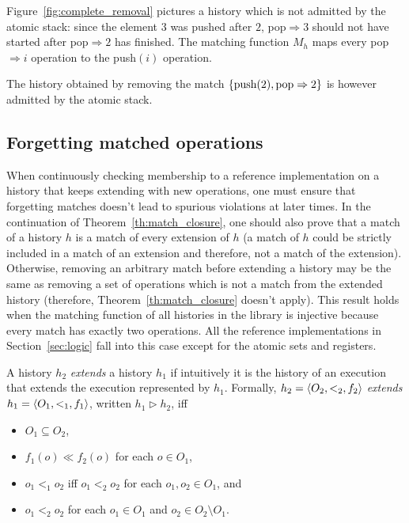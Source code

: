 \begin{example}
  \label{ex:complete_removal}

  Figure~\ref{fig:complete_removal} pictures a history which is not admitted by
  the atomic stack: since the element $3$ was pushed after $2$, pop$\Rightarrow
  3$ should not have started after pop$\Rightarrow 2$ has finished. The
  matching function $M_h$ maps every pop$\Rightarrow i$ operation to the
  push$(i)$ operation.

  The history obtained by removing the match ${\{  \text{push}(2),
  \text{pop}\Rightarrow 2  \}}$ is however admitted by the atomic stack.

\end{example}

\subsection{Forgetting matched operations}

When continuously checking membership to a reference implementation on a
history that keeps extending with new operations, one must ensure that
forgetting matches doesn't lead to spurious violations at later times. In the
continuation of Theorem~\ref{th:match_closure}, one should also prove that a
match of a history $h$ is a match of every extension of $h$ (a match of $h$
could be strictly included in a match of an extension and therefore, not a
match of the extension). Otherwise, removing an arbitrary match before
extending a history may be the same as removing a set of operations which is
not a match from the extended history (therefore,
Theorem~\ref{th:match_closure} doesn't apply). This result holds when the
matching function of all histories in the library is injective because every
match has exactly two operations. All the reference implementations in
Section~\ref{sec:logic} fall into this case except for the atomic sets and
registers.

A history $h_2$ \emph{extends} a history $h_1$ if intuitively it is the history
of an execution that extends the execution represented by $h_1$. Formally, $h_2
= {\langle{O_2,<_2,f_2}\rangle}$ \emph{extends} $h_1 = {\langle{O_1,<_1,f_1}\rangle}$, written $h_1
\vartriangleright h_2$, iff
\begin{itemize}

	\item $O_1\subseteq O_2$, 
	
	\item $f_1(o) \ll f_2(o)$ for each $o \in O_1$,
	
	\item $o_1 <_1 o_2$ iff $o_1 <_2 o_2$ for each $o_1,o_2\in O_1$, and
	
	\item $o_1 <_2 o_2$ for each $o_1\in O_1$ and $o_2\in O_2\setminus O_1$.

\end{itemize}

